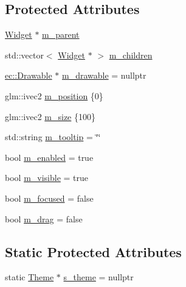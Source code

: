 \subsection*{Protected Attributes}
\begin{DoxyCompactItemize}
\item 
\mbox{\hyperlink{classec__gui_1_1_widget}{Widget}} $\ast$ \mbox{\hyperlink{classec__gui_1_1_widget_a49b565b75e72cf4535e3d61e87cc25f8}{m\+\_\+parent}}
\item 
std\+::vector$<$ \mbox{\hyperlink{classec__gui_1_1_widget}{Widget}} $\ast$ $>$ \mbox{\hyperlink{classec__gui_1_1_widget_ad80b6bc6ae666273b733246001f3c277}{m\+\_\+children}}
\item 
\mbox{\hyperlink{classec_1_1_drawable}{ec\+::\+Drawable}} $\ast$ \mbox{\hyperlink{classec__gui_1_1_widget_a9f35ffedabfbd15d9de62b82509376d3}{m\+\_\+drawable}} = nullptr
\item 
glm\+::ivec2 \mbox{\hyperlink{classec__gui_1_1_widget_ac18ec15d2929f5a7e37461bab8ee34c0}{m\+\_\+position}} \{0\}
\item 
glm\+::ivec2 \mbox{\hyperlink{classec__gui_1_1_widget_a01846fa7b80a21aa7fed1813a29b7cc2}{m\+\_\+size}} \{100\}
\item 
std\+::string \mbox{\hyperlink{classec__gui_1_1_widget_ade1a9106e3877f2f56ea1473b4964c74}{m\+\_\+tooltip}} = \char`\"{}\char`\"{}
\item 
bool \mbox{\hyperlink{classec__gui_1_1_widget_a6df52d208d536654a4216f5de8c78aad}{m\+\_\+enabled}} = true
\item 
bool \mbox{\hyperlink{classec__gui_1_1_widget_ac9266ce41736476342354d016d4535b2}{m\+\_\+visible}} = true
\item 
bool \mbox{\hyperlink{classec__gui_1_1_widget_a6eefde861da81a8319956a4d56c4337c}{m\+\_\+focused}} = false
\item 
bool \mbox{\hyperlink{classec__gui_1_1_widget_a811ede6c4aae70632efd37eebfef0b0b}{m\+\_\+drag}} = false
\end{DoxyCompactItemize}
\subsection*{Static Protected Attributes}
\begin{DoxyCompactItemize}
\item 
static \mbox{\hyperlink{classec__gui_1_1_theme}{Theme}} $\ast$ \mbox{\hyperlink{classec__gui_1_1_widget_aabaff3a7961627152cd9555631be45ec}{s\+\_\+theme}} = nullptr
\end{DoxyCompactItemize}


